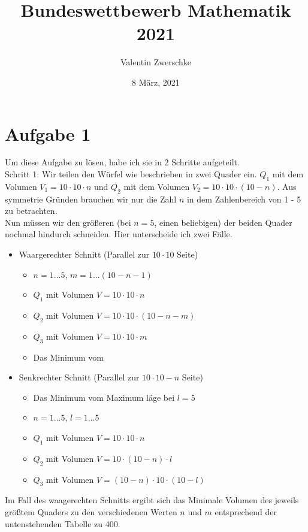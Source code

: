 \documentclass{article}
\title{Bundeswettbewerb Mathematik 2021}
\author{Valentin Zwerschke}
\date{8 März, 2021}
\begin{document}
\maketitle

\section*{Aufgabe 1}
Um diese Aufgabe zu lösen, habe ich sie in 2 Schritte aufgeteilt.\\
Schritt 1: Wir teilen den Würfel wie beschrieben in zwei Quader ein. \(Q_1\) mit dem Volumen \(V_1 = 10 \cdot 10 \cdot n\) und $Q_2$ mit dem Volumen \(V_2 = 10 \cdot 10 \cdot (10 - n)\). Aus symmetrie Gründen brauchen wir nur die Zahl $n$ in dem Zahlenbereich von 1 - 5 zu betrachten.\\
Nun müssen wir den größeren (bei $n = 5$, einen beliebigen) der beiden Quader nochmal hindurch schneiden. Hier unterscheide ich zwei Fälle.\\
\begin{itemize}
    \item Waargerechter Schnitt (Parallel zur \(10 \cdot 10\) Seite)
    \begin{itemize}
        \item $n = 1 ... 5$, $m = 1 ... (10 - n - 1)$
        \item \(Q_1\) mit Volumen $V = 10 \cdot 10 \cdot n$
        \item \(Q_2\) mit Volumen $V = 10 \cdot 10 \cdot (10 - n - m)$
        \item \(Q_3\) mit Volumen $V = 10 \cdot 10 \cdot m$
        \item Das Minimum vom
    \end{itemize}
    \item Senkrechter Schnitt (Parallel zur \(10 \cdot 10 - n\) Seite)
    \begin{itemize}
        \item Das Minimum vom Maximum läge bei $l = 5$
        \item $n = 1 ... 5$, $l = 1 ... 5$
        \item \(Q_1\) mit Volumen $V = 10 \cdot 10 \cdot n$
        \item \(Q_2\) mit Volumen $V = 10 \cdot (10 - n) \cdot l$
        \item \(Q_3\) mit Volumen $V = (10 - n) \cdot 10 \cdot (10 - l)$
    \end{itemize}
\end{itemize}
\newpage
Im Fall des waagerechten Schnitts ergibt sich das Minimale Volumen des jeweils größtem Quaders zu den verschiedenen Werten $n$ und $m$ entsprechend der untenstehenden Tabelle zu 400.\\\\
\end{document}
